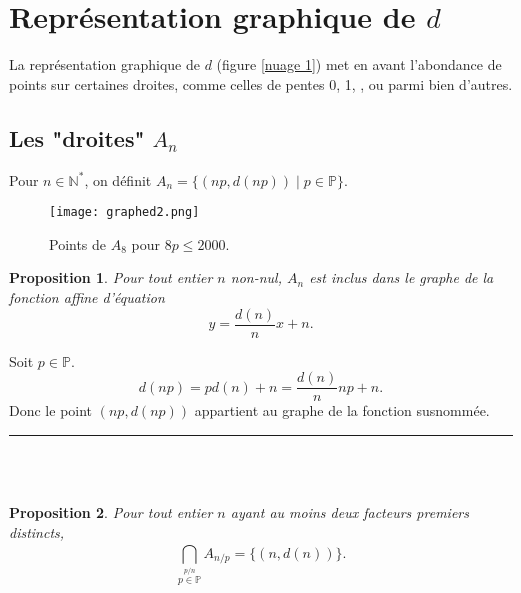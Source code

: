 \documentclass[a4paper, 12pt]{article}
\newcommand{\N}{\mathbb{N}}
\newcommand{\Pm}{\mathbb{P}}
\newcommand{\Prv}{\noindent{\it Preuve. }}
\newcommand{\cqfd}{\rule{0.2cm}{0.2cm}}
\newtheorem{prop}{Proposition}
\begin{document}
\newpage

\section{Représentation graphique de $d$}

La représentation graphique de $d$ (figure \ref{nuage 1}) met en avant l'abondance de points sur certaines droites, comme celles de pentes 0, 1, ,  ou  parmi bien d'autres. \\


\subsection{Les "droites" $A_n$}

Pour $n \in \N^{*}$, on définit $A_n= \{(np, d(np)) \mid p \in \Pm \}$.

\begin{figure}[ht]
\begin{center}
\texttt{[image: graphed2.png]}
\end{center}
\caption{\footnotesize{Points de $A_8$ pour $8p \le 2000$.}}
\label{nuage 2}
\end{figure}

\begin{prop} \label{prop2}
Pour tout entier $n$ non-nul, $A_n$ est inclus dans le graphe de la fonction affine d'équation \begin{equation} \label{eq2} y=\frac{d(n)}{n} x + n. \end{equation}
\end{prop}

\Prv Soit $p \in \Pm$.
\[d(np) = pd(n)+n = \frac{d(n)}{n} np + n.\]
Donc le point $(np, d(np))$ appartient au graphe de la fonction susnommée. \cqfd \\ \\

\begin{prop} \label{prop3}
Pour tout entier $n$ ayant au moins deux facteurs premiers distincts,
\begin{equation} \label{eq3} \bigcap_{\stackrel {p/n}{p \in \Pm}}^{} A_{n/p}= \{(n, d(n))\}. \end{equation}
\end{prop}
\end{document}
